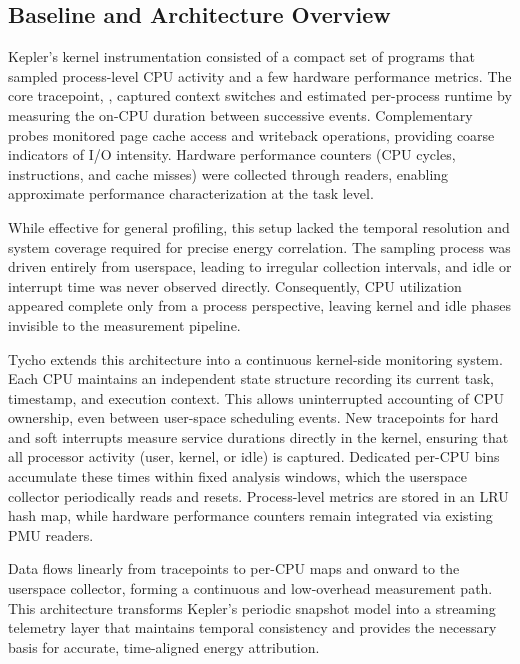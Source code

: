 \subsection{Baseline and Architecture Overview}
\label{subsec:ebpf-overview}

Kepler’s kernel instrumentation consisted of a compact set of  programs that sampled process-level CPU activity and a few hardware performance metrics.  
The core tracepoint, , captured context switches and estimated per-process runtime by measuring the on-CPU duration between successive events.  
Complementary probes monitored page cache access and writeback operations, providing coarse indicators of I/O intensity.  
Hardware performance counters (CPU cycles, instructions, and cache misses) were collected through  readers, enabling approximate performance characterization at the task level.

While effective for general profiling, this setup lacked the temporal resolution and system coverage required for precise energy correlation.  
The sampling process was driven entirely from userspace, leading to irregular collection intervals, and idle or interrupt time was never observed directly.  
Consequently, CPU utilization appeared complete only from a process perspective, leaving kernel and idle phases invisible to the measurement pipeline.

Tycho extends this architecture into a continuous kernel-side monitoring system.  
Each CPU maintains an independent state structure recording its current task, timestamp, and execution context.  
This allows uninterrupted accounting of CPU ownership, even between user-space scheduling events.  
New tracepoints for hard and soft interrupts measure service durations directly in the kernel, ensuring that all processor activity (user, kernel, or idle) is captured.  
Dedicated per-CPU bins accumulate these times within fixed analysis windows, which the userspace collector periodically reads and resets.  
Process-level metrics are stored in an LRU hash map, while hardware performance counters remain integrated via existing PMU readers.

Data flows linearly from tracepoints to per-CPU maps and onward to the userspace collector, forming a continuous and low-overhead measurement path.  
This architecture transforms Kepler’s periodic snapshot model into a streaming telemetry layer that maintains temporal consistency and provides the necessary basis for accurate, time-aligned energy attribution.


